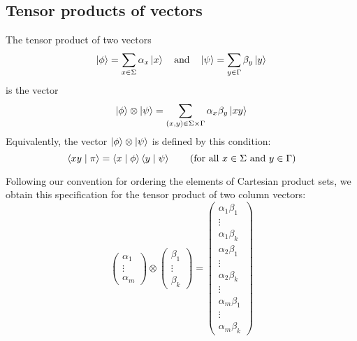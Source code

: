 \documentclass{report}
\begin{document}
\subsection{Tensor products of vectors}
The tensor product of two vectors
\begin{equation*}
    \ket{\phi}=\sum\limits_{x\in\Sigma}\alpha_x\ket{x} \quad \text{and} \quad \ket{\psi}=\sum\limits_{y\in\Gamma}\beta_y\ket{y}
\end{equation*}
is the vector
\begin{equation*}
    \ket{\phi}\otimes\ket{\psi}=\sum\limits_{(x,y)\in\Sigma\times\Gamma}\alpha_x\beta_y\ket{xy}
\end{equation*}
Equivalently, the vector $\ket{\phi}\otimes\ket{\psi}$ is defined by this condition:
\begin{equation*}
    \braket{xy\mid\pi}=\braket{x\mid\phi}\braket{y\mid\psi} \qquad \text{(for all } x\in\Sigma \text{ and } y\in\Gamma \text{)}
\end{equation*}


Following our convention for ordering the elements of Cartesian product sets, we obtain this specification for the tensor product of two column vectors:
\begin{equation*}
    \begin{pmatrix}
        \alpha_1 \\
        \vdots \\
        \alpha_m
    \end{pmatrix}
    \otimes
    \begin{pmatrix}
        \beta_1 \\
        \vdots \\
        \beta_k
    \end{pmatrix}
    =
    \begin{pmatrix}
        \alpha_1\beta_1 \\
        \vdots \\
        \alpha_1\beta_k \\
        \alpha_2\beta_1 \\
        \vdots \\
        \alpha_2\beta_k \\
        \vdots \\
        \alpha_m\beta_1 \\
        \vdots \\
        \alpha_m\beta_k
    \end{pmatrix}
\end{equation*}
\end{document}
